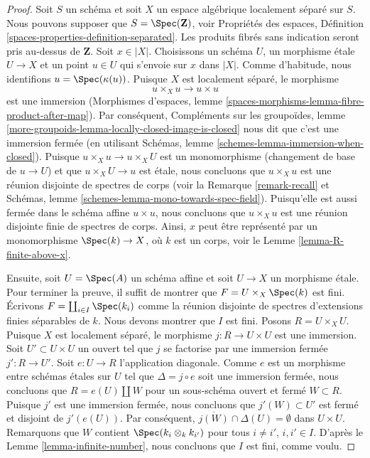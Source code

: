 \begin{proof}
Soit $S$ un schéma et soit $X$ un espace algébrique localement séparé sur
$S$. Nous pouvons supposer que $S = \Spec(\mathbf{Z})$, voir
Propriétés des espaces, Définition
\ref{spaces-properties-definition-separated}.
Les produits fibrés sans indication seront pris au-dessus de $\mathbf{Z}$.
Soit $x \in |X|$. Choisissons un schéma $U$, un morphisme étale
$U \to X$ et un point $u \in U$ qui s'envoie sur $x$ dans $|X|$.
Comme d'habitude, nous identifions $u = \Spec(\kappa(u))$.
Puisque $X$ est localement séparé, le morphisme
$$
u \times_X u \to u \times u
$$
est une immersion (Morphismes d'espaces, lemme
\ref{spaces-morphisms-lemma-fibre-product-after-map}).
Par conséquent, Compléments sur les groupoïdes, lemme
\ref{more-groupoids-lemma-locally-closed-image-is-closed}
nous dit que c'est une immersion fermée (en utilisant
Schémas, lemme \ref{schemes-lemma-immersion-when-closed}).
Puisque $u \times_X u \to u \times_X U$ est un monomorphisme (changement de
base de $u \to U$) et que $u \times_X U \to u$ est étale, nous concluons que
$u \times_X u$ est une réunion disjointe de spectres de corps
(voir la Remarque \ref{remark-recall} et
Schémas, lemme \ref{schemes-lemma-mono-towards-spec-field}).
Puisqu'elle est aussi fermée dans le schéma affine $u \times u$, nous
concluons que $u \times_X u$ est une réunion disjointe finie de spectres de
corps. Ainsi, $x$ peut être représenté par un monomorphisme
$\Spec(k) \to X$, où $k$ est un corps, voir le
Lemme \ref{lemma-R-finite-above-x}.

\medskip\noindent
Ensuite, soit $U = \Spec(A)$ un schéma affine et soit $U \to X$ un morphisme
étale. Pour terminer la preuve, il suffit de montrer que
$F = U \times_X \Spec(k)$ est fini. Écrivons
$F = \coprod_{i \in I} \Spec(k_i)$ comme la réunion disjointe de spectres
d'extensions finies séparables de $k$. Nous devons montrer que $I$ est fini.
Posons $R = U \times_X U$. Puisque $X$ est localement séparé, le morphisme
$j : R \to U \times U$ est une immersion. Soit $U' \subset U \times U$ un
ouvert tel que $j$ se factorise par une immersion fermée $j' : R \to U'$.
Soit $e : U \to R$ l'application diagonale. Comme $e$ est un morphisme entre
schémas étales sur $U$ tel que $\Delta = j \circ e$ soit une immersion fermée,
nous concluons que $R = e(U) \amalg W$ pour un sous-schéma ouvert et fermé
$W \subset R$. Puisque $j'$ est une immersion fermée, nous concluons que
$j'(W) \subset U'$ est fermé et disjoint de $j'(e(U))$. Par conséquent,
$\overline{j(W)} \cap \Delta(U) = \emptyset$ dans $U \times U$.
Remarquons que $W$ contient $\Spec(k_i \otimes_k k_{i'})$ pour tous
$i \not = i'$, $i, i' \in I$. D'après le Lemme
\ref{lemma-infinite-number}, nous concluons que $I$ est fini, comme voulu.
\end{proof}








